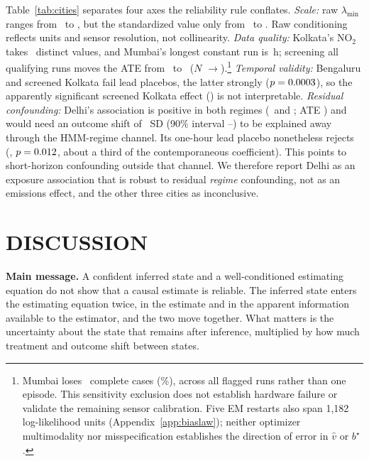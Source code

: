 \documentclass[twoside]{article}
\theoremstyle{definition}
\newcommand{\lmin}{\lambda_{\min}}
\begin{document}
Table~\ref{tab:cities} separates four axes the reliability rule conflates. \emph{Scale:} raw $\lmin$ ranges from \CityLamMin\ to \CityLamMax, but the standardized value only from \CityLamStdMin\ to \CityLamStdMax. Raw conditioning reflects units and sensor resolution, not collinearity. \emph{Data quality:} Kolkata's NO$_2$ takes \AuKolkataUniq\ distinct values, and Mumbai's longest constant run is \AuMumbaiRun\,h; screening all qualifying runs moves the ATE from \CityMumbaiATE\ to \CityMumbaiScrATE\ ($N$ \CityMumbaiN$\to$\CityMumbaiScrN).\footnote{Mumbai loses \CityMumbaiRemoved\ complete cases (\CityMumbaiRemovedPct\%), across all flagged runs rather than one episode. This sensitivity exclusion does not establish hardware failure or validate the remaining sensor calibration. Five EM restarts also span 1,182 log-likelihood units (Appendix~\ref{app:biaslaw}); neither optimizer multimodality nor misspecification establishes the direction of error in $\hat v$ or $b^\star$.} \emph{Temporal validity:} Bengaluru and screened Kolkata fail lead placebos, the latter strongly ($p=0.0003$), so the apparently significant screened Kolkata effect (\CityKolkataScrATE) is not interpretable. \emph{Residual confounding:} Delhi's association is positive in both regimes (\CityDelhiRone\ and \CityDelhiRtwo; ATE \CityDelhiATE) and would need an outcome shift of \BstarDelhi\ SD (90\% interval \BstarDelhiLo--\BstarDelhiHi) to be explained away through the HMM-regime channel. Its one-hour lead placebo nonetheless rejects (\PlDelhiLead, $p=0.012$, about a third of the contemporaneous coefficient). This points to short-horizon confounding outside that channel. We therefore report Delhi as an exposure association that is robust to residual \emph{regime} confounding, not as an emissions effect, and the other three cities as inconclusive.

\section{DISCUSSION}
\label{sec:conclusion}

\textbf{Main message.} A confident inferred state and a well-conditioned estimating equation do not show that a causal estimate is reliable. The inferred state enters the estimating equation twice, in the estimate and in the apparent information available to the estimator, and the two move together. What matters is the uncertainty about the state that remains after inference, multiplied by how much treatment and outcome shift between states.
\end{document}
